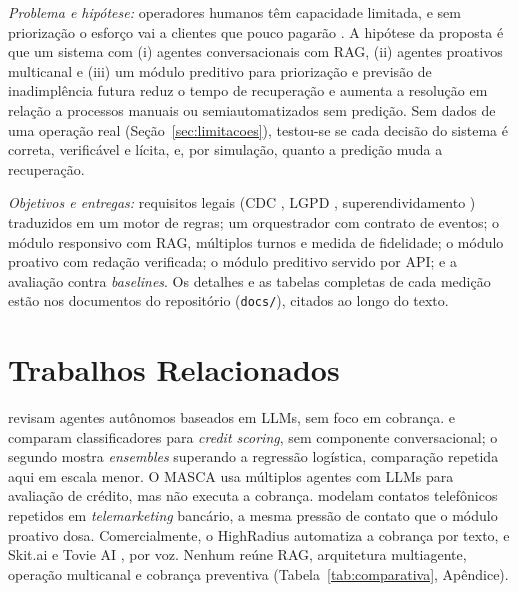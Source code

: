 \documentclass[portuguese]{sbcreviews-2025}%
\begin{document}
\textit{Problema e hipótese:} operadores humanos têm capacidade limitada, e sem priorização o esforço vai a clientes que pouco pagarão \cite{thomas2009credit}. A hipótese da proposta é que um sistema com (i) agentes conversacionais com RAG, (ii) agentes proativos multicanal e (iii) um módulo preditivo para priorização e previsão de inadimplência futura reduz o tempo de recuperação e aumenta a resolução em relação a processos manuais ou semiautomatizados sem predição. Sem dados de uma operação real (Seção~\ref{sec:limitacoes}), testou-se se cada decisão do sistema é correta, verificável e lícita, e, por simulação, quanto a predição muda a recuperação.

\textit{Objetivos e entregas:} requisitos legais (CDC \cite{cdc1990}, LGPD \cite{lgpd2018}, superendividamento \cite{lei14181}) traduzidos em um motor de regras; um orquestrador com contrato de eventos; o módulo responsivo com RAG, múltiplos turnos e medida de fidelidade; o módulo proativo com redação verificada; o módulo preditivo servido por API; e a avaliação contra \textit{baselines}. Os detalhes e as tabelas completas de cada medição estão nos documentos do repositório (\texttt{docs/}), citados ao longo do texto.

\section{Trabalhos Relacionados}
\label{sec:tr}

\citet{wang2024survey} revisam agentes autônomos baseados em LLMs, sem foco em cobrança. \citet{mestiri2024credit} e \citet{lessmann2015benchmarking} comparam classificadores para \textit{credit scoring}, sem componente conversacional; o segundo mostra \textit{ensembles} superando a regressão logística, comparação repetida aqui em escala menor. O MASCA \cite{jajoo2025masca} usa múltiplos agentes com LLMs para avaliação de crédito, mas não executa a cobrança. \citet{moro2014data} modelam contatos telefônicos repetidos em \textit{telemarketing} bancário, a mesma pressão de contato que o módulo proativo dosa. Comercialmente, o HighRadius \cite{highradius} automatiza a cobrança por texto, e Skit.ai \cite{skitai} e Tovie AI \cite{tovieai}, por voz. Nenhum reúne RAG, arquitetura multiagente, operação multicanal e cobrança preventiva (Tabela~\ref{tab:comparativa}, Apêndice).

\end{document}
